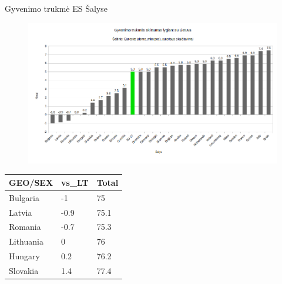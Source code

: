 \documentclass[11pt,xcolor=table,aspectratio=169]{beamer}
\begin{document}
\begin{frame}{Gyvenimo trukmė ES Šalyse}
\begin{figure}
\includegraphics[scale=0.35]{bar_chart_eu_diff_lt.png}
\end{figure}
\end{frame}


\begin{frame}
\begin{table}[]
\begin{tabular}{@{}lll@{}}
\toprule
GEO/SEX   & vs\_LT & Total \\ \midrule
Bulgaria  & -1     & 75    \\
Latvia    & -0.9   & 75.1  \\
Romania   & -0.7   & 75.3  \\
Lithuania & 0      & 76    \\
Hungary   & 0.2    & 76.2  \\
Slovakia  & 1.4    & 77.4  \\ \bottomrule
\end{tabular}
\end{table}
\end{frame}
\end{document}

